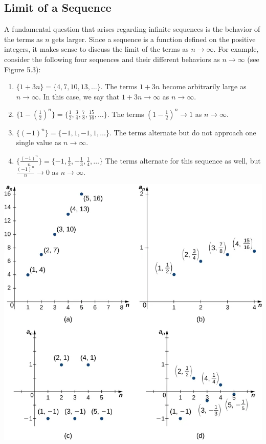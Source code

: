 \documentclass{report}
\begin{document}
    \subsection*{Limit of a Sequence}
    \bigbreak \noindent 
    A fundamental question that arises regarding infinite sequences is the behavior of the terms as \( n \) gets larger. Since a sequence is a function defined on the positive integers, it makes sense to discuss the limit of the terms as \( n \to \infty \). For example, consider the following four sequences and their different behaviors as \( n \to \infty \) (see Figure 5.3):
    \begin{enumerate}
        \item $\{1+3n\} = \{4,7,10,13,\ldots\}$. The terms \(1+3n\) become arbitrarily large as \(n \to \infty\). In this case, we say that \(1+3n \to \infty\) as \(n \to \infty\).
        
        \item $\{1-\left(\frac{1}{2}\right)^{n}\} = \{\frac{1}{2},\frac{3}{4},\frac{7}{8},\frac{15}{16},\ldots\}$. The terms \(\left(1-\frac{1}{2}\right)^{n} \to 1\) as \(n \to \infty\).
        
        \item $\{(-1)^n\} = \{-1,1,-1,1,\ldots\}$.  The terms alternate but do not approach one single value as \(n \to \infty\).
        
        \item $\{\frac{(-1)^{n}}{n}\} = \{-1,\frac{1}{2},-\frac{1}{3},\frac{1}{4},\ldots\}$ 
        The terms alternate for this sequence as well, but \(\frac{(-1)^{n}}{n}  \to 0\) as \(n \to \infty\).
    \end{enumerate}
    \bigbreak \noindent 
    \begin{center}
        \includegraphics[scale=0.4]{./figures/mane7.png}
    \end{center}
\end{document}
